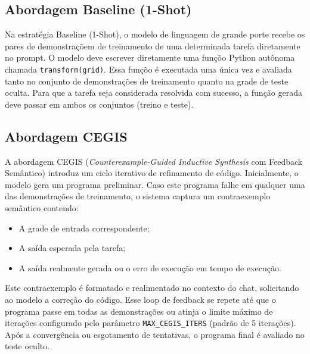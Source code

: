 \documentclass[letterpaper]{article} %
\begin{document}
\subsection{Abordagem Baseline (1-Shot)}
Na estrat{\'e}gia Baseline (1-Shot), o modelo de linguagem de grande porte recebe os pares de demonstra{\c{c}}{\~o}em de treinamento de uma determinada tarefa diretamente no prompt. O modelo deve escrever diretamente uma fun{\c{c}}{\~o}o Python aut{\^o}noma chamada \texttt{transform(grid)}. Essa fun{\c{c}}{\~o}o {\'e} executada uma {\'u}nica vez e avaliada tanto no conjunto de demonstra{\c{c}}{\~o}es de treinamento quanto na grade de teste oculta. Para que a tarefa seja considerada resolvida com sucesso, a fun{\c{c}}{\~a}o gerada deve passar em ambos os conjuntos (treino e teste).

\subsection{Abordagem CEGIS}
A abordagem CEGIS (\textit{Counterexample-Guided Inductive Synthesis} com Feedback Sem{\^a}ntico) introduz um ciclo iterativo de refinamento de c{\'o}digo. Inicialmente, o modelo gera um programa preliminar. Caso este programa falhe em qualquer uma das demonstra{\c{c}}{\~o}es de treinamento, o sistema captura um contraexemplo sem{\^a}ntico contendo:
\begin{itemize}
    \item A grade de entrada correspondente;
    \item A sa{\'i}da esperada pela tarefa;
    \item A sa{\'i}da realmente gerada ou o erro de execu{\c{c}}{\~a}o em tempo de execu{\c{c}}{\~a}o.
\end{itemize}
Este contraexemplo {\'e} formatado e realimentado no contexto do chat, solicitando ao modelo a corre{\c{c}}{\~a}o do c{\'o}digo. Esse loop de feedback se repete at{\'e} que o programa passe em todas as demonstra{\c{c}}{\~o}es ou atinja o limite m{\'a}ximo de itera{\c{c}}{\~o}es configurado pelo par{\^a}metro \texttt{MAX\_CEGIS\_ITERS} (padr{\~a}o de 5 itera{\c{c}}{\~o}es). Ap{\'o}s a converg{\^e}ncia ou esgotamento de tentativas, o programa final {\'e} avaliado no teste oculto.
\end{document}
